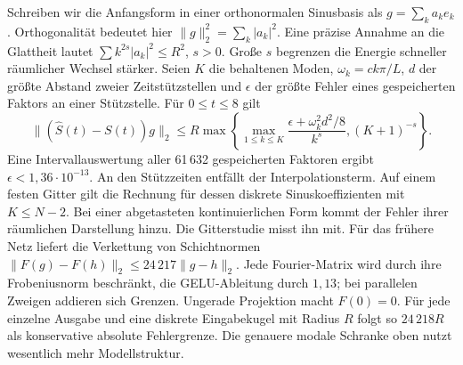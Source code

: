 Schreiben wir die Anfangsform in einer orthonormalen Sinusbasis als \(g=\sum_k a_k e_k\). Orthogonalität bedeutet hier \(\|g\|_2^2=\sum_k |a_k|^2\). Eine präzise Annahme an die Glattheit lautet \(\sum k^{2s}|a_k|^2\le R^2\), \(s>0\). Große \(s\) begrenzen die Energie schneller räumlicher Wechsel stärker.
Seien \(K\) die behaltenen Moden, \(\omega_k=ck\pi/L\), \(d\) der größte Abstand zweier Zeitstützstellen und \(\epsilon\) der größte Fehler eines gespeicherten Faktors an einer Stützstelle. Für \(0\le t\le8\) gilt
\[
 \|(\widehat S(t)-S(t))g\|_2 \le R\max\!\left\{
 \max_{1\le k\le K}\frac{\epsilon+\omega_k^2d^2/8}{k^s},
 (K+1)^{-s}\right\}.
\]
Eine Intervallauswertung aller 61\,632 gespeicherten Faktoren ergibt \(\epsilon<1{,}36\cdot10^{-13}\). An den Stützzeiten entfällt der Interpolationsterm. Auf einem festen Gitter gilt die Rechnung für dessen diskrete Sinuskoeffizienten mit \(K\le N-2\). Bei einer abgetasteten kontinuierlichen Form kommt der Fehler ihrer räumlichen Darstellung hinzu. Die Gitterstudie misst ihn mit.
Für das frühere Netz liefert die Verkettung von Schichtnormen \(\|F(g)-F(h)\|_2\le24\,217\|g-h\|_2\). Jede Fourier-Matrix wird durch ihre Frobeniusnorm beschränkt, die GELU-Ableitung durch \(1{,}13\); bei parallelen Zweigen addieren sich Grenzen. Ungerade Projektion macht \(F(0)=0\). Für jede einzelne Ausgabe und eine diskrete Eingabekugel mit Radius \(R\) folgt so \(24\,218R\) als konservative absolute Fehlergrenze. Die genauere modale Schranke oben nutzt wesentlich mehr Modellstruktur.


